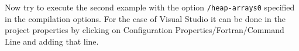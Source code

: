 Now try to execute the second example with the option \texttt{/heap-arrays0} specified in the compilation options. For the case of Visual Studio it can be done in the project properties by clicking on Configuration Properties/Fortran/Command Line and adding that line.







%


%  
  